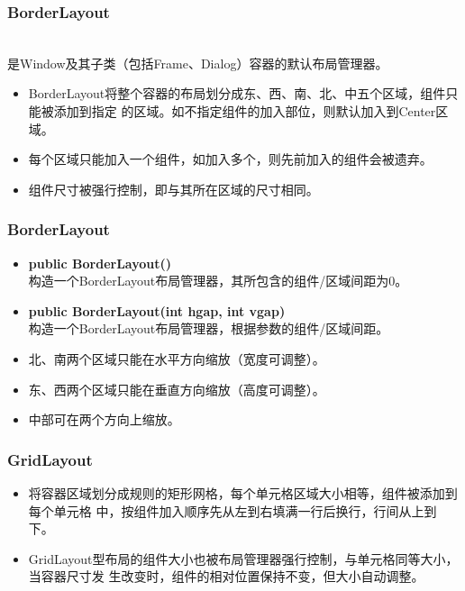 \begin{frame}[fragile] %
\frametitle{BorderLayout}

 \\是Window及其子类（包括Frame、Dialog）容器的默认布局管理器。

\begin{itemize}
\item BorderLayout将整个容器的布局划分成东、西、南、北、中五个区域，组件只能被添加到指定
  的区域。如不指定组件的加入部位，则默认加入到Center区域。
\item 每个区域只能加入一个组件，如加入多个，则先前加入的组件会被遗弃。
\item 组件尺寸被强行控制，即与其所在区域的尺寸相同。
\end{itemize}
\end{frame}

\begin{frame}[fragile] %
  \frametitle{BorderLayout}

  
  \begin{itemize}\kai
  \item {\bf public BorderLayout()}\\
    构造一个BorderLayout布局管理器，其所包含的组件/区域间距为0。
  \item {\bf public BorderLayout(int hgap, int vgap)}\\
    构造一个BorderLayout布局管理器，根据参数的组件/区域间距。
  \end{itemize}


  \begin{itemize}\kai
  \item 北、南两个区域只能在水平方向缩放（宽度可调整）。
  \item 东、西两个区域只能在垂直方向缩放（高度可调整）。
  \item 中部可在两个方向上缩放。
  \end{itemize}
\end{frame}

\begin{frame}[fragile] %
  \frametitle{GridLayout}


  \begin{itemize}\small
  \item 将容器区域划分成规则的矩形网格，每个单元格区域大小相等，组件被添加到每个单元格
    中，按组件加入顺序先从左到右填满一行后换行，行间从上到下。
  \item GridLayout型布局的组件大小也被布局管理器强行控制，与单元格同等大小，当容器尺寸发
    生改变时，组件的相对位置保持不变，但大小自动调整。
  \end{itemize}

\end{frame}

